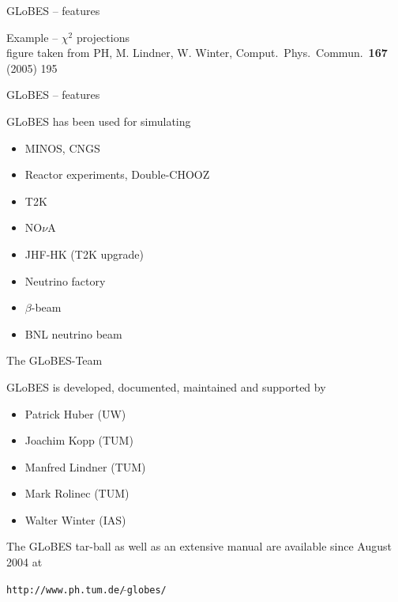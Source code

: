\documentclass[pdf,ps2pdf,azure,slideColor,colorBG]{prosper}
\begin{document}
\begin{slide}{GLoBES -- features}

Example -- $\chi^2$ projections\\
{\tiny figure taken from PH, M. Lindner, W. Winter, Comput.\ Phys.\ Commun.\  {\bf 167} (2005) 195}

\end{slide}
\begin{slide}{GLoBES -- features}

GLoBES has been used for simulating
\begin{itemize}
\item MINOS, CNGS
\item Reactor experiments, Double-CHOOZ
\item T2K
\item NO$\nu$A
\item JHF-HK (T2K upgrade)
\item Neutrino factory
\item $\beta$-beam
\item BNL neutrino beam
\end{itemize}
\end{slide}
\begin{slide}{The GLoBES-Team}

GLoBES is developed, documented, maintained and supported by
\begin{itemize}
\item Patrick Huber (UW)
\item Joachim Kopp (TUM)
\item Manfred Lindner (TUM)
\item Mark Rolinec (TUM)
\item Walter Winter (IAS)
\end{itemize}
\vspace*{1cm}
The GLoBES tar-ball as well as an extensive manual 
are available since August 2004 at\\
\begin{center}
{\tt http://www.ph.tum.de/$\,\tilde{}$globes/}
\end{center} 

\end{slide}
\end{document}
